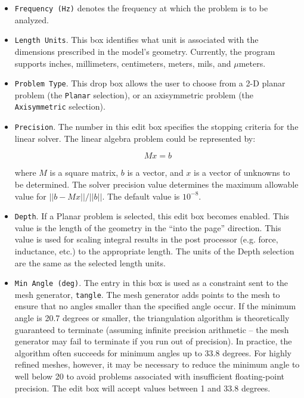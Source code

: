 \begin{itemize}

\item{\tt Frequency (Hz)} denotes the frequency at which the problem is
to be analyzed.

\item{\tt Length Units}. This box identifies
what unit is associated with the dimensions prescribed in the
model's geometry. Currently, the program supports inches,
millimeters, centimeters, meters, mils, and $\mu $meters.

\item{\tt Problem Type}. This
drop box allows the user to choose from a 2-D planar problem (the
\texttt{Planar} selection), or an axisymmetric problem (the
\texttt{Axisymmetric} selection).

\item{\tt Precision}. The
number in this edit box specifies the stopping criteria for the
linear solver. The linear algebra problem could be represented by:

\begin{displaymath}
M x = b
\end{displaymath}

\noindent
where $M$ is a square matrix, $b$ is a vector, and $x$ is a vector of
unknowns to be determined. The solver precision value determines the maximum
allowable value for $\vert \vert b - Mx\vert \vert / \vert \vert b\vert
\vert $. The default value is $10^{ - 8}$.

\item{\tt Depth}. If a Planar
problem is selected, this edit box becomes enabled. This value is
the length of the geometry in the ``into the page'' direction. This
value is used for scaling integral results in the post processor
(e.g. force, inductance, etc.) to the appropriate length. The units
of the Depth selection are the same as the selected length units.

\item{\tt Min Angle (deg)}.  The entry in this box is used as a
constraint sent to the mesh generator, {\tt tangle}.  The mesh generator
adds points to the mesh to
ensure that no angles smaller than the specified angle occur. If the minimum angle
is 20.7 degrees or smaller, the triangulation algorithm is theoretically guaranteed to
terminate (assuming infinite precision arithmetic -- the mesh generator may
fail to terminate if you run out of precision).  In practice, the
algorithm often succeeds for minimum angles up to 33.8 degrees.
For highly refined meshes, however, it may be necessary to reduce
the minimum angle to well below 20 to avoid problems associated
with insufficient floating-point precision.  The edit box will accept
values between 1 and 33.8 degrees.


\end{itemize}
